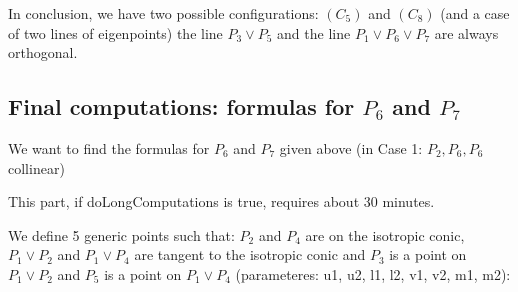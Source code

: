\documentclass[11pt]{article}
\begin{document}
    In conclusion, we have two possible configurations: \((C_5)\) and
\((C_8)\) (and a case of two lines of eigenpoints) the line
\(P_3 \vee P_5\) and the line \(P_1 \vee P_6 \vee P_7\) are always
orthogonal.

    \hypertarget{final-computations-formulas-for-p_6-and-p_7}{%
\subsection{\texorpdfstring{Final computations: formulas for \(P_6\) and
\(P_7\)}{Final computations: formulas for P\_6 and P\_7}}\label{final-computations-formulas-for-p_6-and-p_7}}

We want to find the formulas for \(P_6\) and \(P_7\) given above (in
Case 1: \(P_2, P_6, P_6\) collinear)

This part, if doLongComputations is true, requires about 30 minutes.

    We define 5 generic points such that: \(P_2\) and \(P_4\) are on the
isotropic conic, \(P_1 \vee P_2\) and \(P_1 \vee P_4\) are tangent to
the isotropic conic and \(P_3\) is a point on \(P_1 \vee P_2\) and
\(P_5\) is a point on \(P_1 \vee P_4\) (parameteres: u1, u2, l1, l2, v1,
v2, m1, m2):
\end{document}
